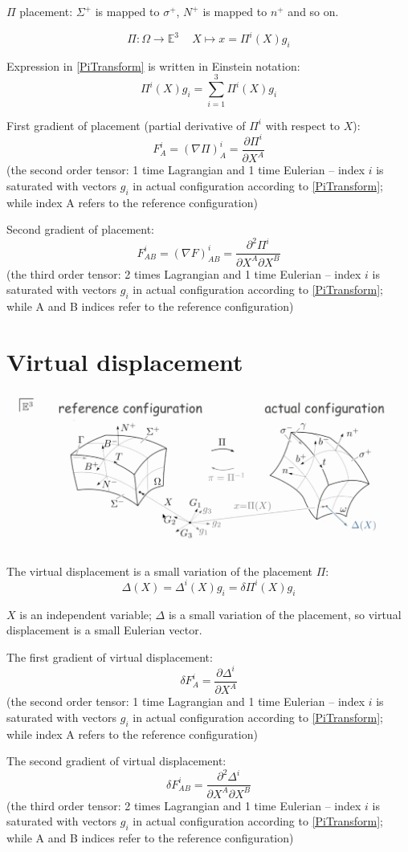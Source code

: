 \documentclass[a4paper,12pt]{article}
\newcommand{\beq}{\begin{equation}}
\newcommand{\eeq}{\end{equation}}
\begin{document}
$\Pi$ placement: $\Sigma^+$ is mapped to $\sigma^+$, $N^+$ is mapped to $n^+$ and so on.

\beq\label{PiTransform}
\Pi: \Omega\rightarrow\mathbb{E}^3\,\,\,\,\,\,\,X\mapsto x=\Pi^i(X)g_i
\eeq

Expression in \eqref{PiTransform} is written in Einstein notation:
\beq
\Pi^i(X)g_i=\sum\limits_{i=1}^3\Pi^i(X)g_i
\eeq

First gradient of placement (partial derivative of $\Pi^i$ with respect to $X$):
\beq
F_A^i=(\nabla\Pi)_A^i=\frac{\partial\Pi^i}{\partial X^A}
\eeq
(the second order tensor: 1 time Lagrangian and 1 time Eulerian -- index $i$ is saturated with vectors $g_i$ in actual configuration according to \eqref{PiTransform}; while index A refers to the reference configuration)


Second gradient of placement:
\beq
F_{AB}^i=(\nabla F)_{AB}^i=\frac{\partial^2\Pi^i}{\partial X^A\partial X^B}
\eeq
(the third order tensor: 2 times Lagrangian and 1 time Eulerian -- index $i$ is saturated with vectors $g_i$ in actual configuration according to \eqref{PiTransform}; while A and B indices refer to the reference configuration)

\newpage

\section{Virtual displacement}
\includegraphics[width=\textwidth]{VirtualDisplacement}

The virtual displacement is a small variation of the placement $\Pi$:
\beq
\Delta(X)=\Delta^i(X)g_i=\delta\Pi^i(X)g_i
\eeq

$X$ is an independent variable; $\Delta$ is a small variation of the placement, so virtual displacement is a small Eulerian vector.

The first gradient of virtual displacement:
\beq
\delta F_A^i=\frac{\partial\Delta^i}{\partial X^A}
\eeq
(the second order tensor: 1 time Lagrangian and 1 time Eulerian -- index $i$ is saturated with vectors $g_i$ in actual configuration according to \eqref{PiTransform}; while index A refers to the reference configuration)

The second gradient of virtual displacement:
\beq
\delta F_{AB}^i=\frac{\partial^2\Delta^i}{\partial X^A\partial X^B}
\eeq
(the third order tensor: 2 times Lagrangian and 1 time Eulerian -- index $i$ is saturated with vectors $g_i$ in actual configuration according to \eqref{PiTransform}; while A and B indices refer to the reference configuration)
\end{document}
